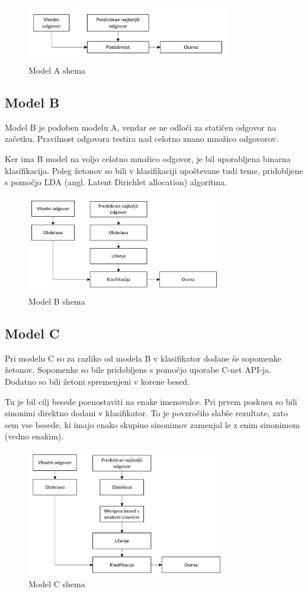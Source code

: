 \documentclass[journal]{IEEEtran}
\begin{document}
\begin{figure}[h]
	\centering
	\includegraphics[width=3.5in]{A}
	\caption{Model A shema}
	\label{sl:ma}
\end{figure}

\subsection{Model B}
Model B je podoben modelu A, vendar se ne odloči za statičen odgovor na začetku. Pravilnost odgovora testira nad celotno znano množico odgovorov.

Ker ima B model na voljo celotno množico odgovor, je bil uporabljena binarna klasifikacija. Poleg žetonov so bili v klasifikaciji upoštevane tudi teme, pridobljene s pomočjo LDA (angl. Latent Dirichlet allocation) algoritma.

\begin{figure}[h]
	\centering
	\includegraphics[width=3.4in]{B}
	\caption{Model B shema}
	\label{sl:mb}
\end{figure}

\subsection{Model C}
Pri modelu C so za razliko od modela B v klasifikator dodane še sopomenke žetonov. Sopomenke so bile pridobljene s pomočjo uporabe C-net API-ja. Dodatno so bili žetoni spremenjeni v korene besed.

Tu je bil cilj besede poenostaviti na enake imenovalce. Pri prvem poskusu so bili sinonimi direktno dodani v klasifikator. To je povzročilo slabše rezultate, zato sem vse besede, ki imajo enako skupino sinonimov zamenjal le z enim sinonimom (vedno enakim).

\begin{figure}[h]
	\centering
	\includegraphics[width=3.4in]{C}
	\caption{Model C shema}
	\label{sl:mc}
\end{figure}
\end{document}
